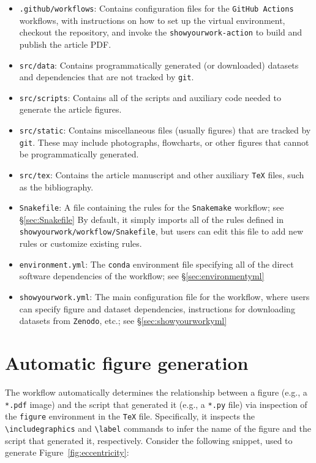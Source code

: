 \documentclass[twocolumn]{aastex631}
\begin{document}
\begin{itemize}
    \item \texttt{.github/workflows}: Contains configuration files for the \texttt{GitHub Actions} workflows, with instructions on how to set up the virtual environment, checkout the repository, and invoke the \texttt{showyourwork-action} to build and publish the article PDF.
    \item \texttt{src/data}: Contains programmatically generated (or downloaded) datasets and dependencies that are not tracked by \texttt{git}.
    \item \texttt{src/scripts}: Contains all of the scripts and auxiliary code needed to generate the article figures.
    \item \texttt{src/static}: Contains miscellaneous files (usually figures) that are tracked by \texttt{git}.
    These may include photographs, flowcharts, or other figures that cannot be programmatically generated.
    \item \texttt{src/tex}: Contains the article manuscript and other auxiliary \texttt{TeX} files, such as the bibliography.
    \item \texttt{Snakefile}: A file containing the rules for the \texttt{Snakemake} workflow; see \S\ref{sec:Snakefile}
    By default, it simply imports all of the rules defined in \texttt{showyourwork/workflow/Snakefile}, but users can edit this file to add new rules or customize existing rules.
    \item \texttt{environment.yml}: The \texttt{conda} environment file specifying all of the direct software dependencies of the workflow; see \S\ref{sec:environmentyml}
    \item \texttt{showyourwork.yml}: The main configuration file for the workflow, where users can specify figure and dataset dependencies, instructions for downloading datasets from \texttt{Zenodo}, etc.; see \S\ref{sec:showyourworkyml}
\end{itemize}

\section{Automatic figure generation}
\label{sec:auto-fig}
%
The workflow automatically determines the relationship between a figure (e.g., a \texttt{*.pdf} image) and the script that generated it (e.g., a \texttt{*.py} file) via inspection of the \texttt{figure} environment in the \texttt{TeX} file. 
Specifically, it inspects the \texttt{{\textbackslash}includegraphics} and \texttt{{\textbackslash}label} commands to infer the name of the figure and the script that generated it, respectively.
Consider the following snippet, used to generate Figure~\ref{fig:eccentricity}:\\
\end{document}
